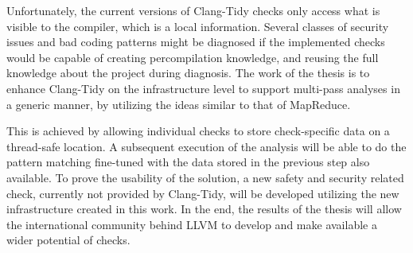 \par Unfortunately, the current versions of Clang-Tidy checks only access what is visible to the compiler, which is a local information.
Several classes of security issues and bad coding patterns might be diagnosed if the implemented checks would be capable of creating 
percompilation knowledge, and reusing the full knowledge about the project during diagnosis.
The work of the thesis is to enhance Clang-Tidy on the infrastructure level to support multi-pass analyses in a generic manner, by 
utilizing the ideas similar to that of MapReduce.
\par This is achieved by allowing individual checks to store check-specific data on a thread-safe location.
A subsequent execution of the analysis will be able to do the pattern matching fine-tuned with the data stored in the previous step also
available.
To prove the usability of the solution, a new safety and security related check, currently not provided by Clang-Tidy, will be developed
utilizing the new infrastructure created in this work.
In the end, the results of the thesis will allow the international community behind LLVM to develop and make available a wider potential of
checks.

